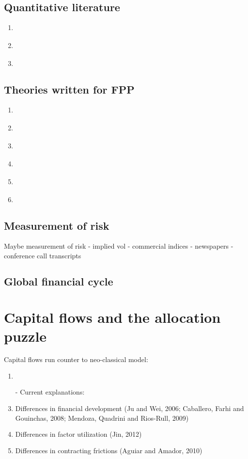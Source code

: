 \documentclass{ar-1col}
\begin{document}
\subsection{Quantitative literature}
\begin{enumerate}
\item \citet{ColacitoCroce2011}
\item \citet{GourioSiemerVerdelhan2013}
\item \citet{ColacitoCroceHoHoward2018}
\end{enumerate}
\subsection{Theories written for FPP}
\begin{enumerate}
    \item \citet{Heyerdahl-Larsen2011}
    \item \citet{Stathopoulos2017}
    \item \citet{Verdelhan2010}
    \item \citet{Backusetal2001}
    \item \citet{BansalShaliastovich2010}
    \item \citet{GabaixMaggiori2015}
\end{enumerate}

\subsection{Measurement of risk}
Maybe measurement of risk - implied vol - commercial indices -
newspapers - conference call transcripts

\subsection{Global financial cycle}

\section{Capital flows and the allocation puzzle}
Capital flows run counter to neo-classical model:
\begin{enumerate}
\item \citet{GourinchasJeanne2013}
\item[-] Current explanations:
\item Differences in financial development (Ju and Wei, 2006;
  Caballero, Farhi and Gouinchas, 2008; Mendoza, Quadrini and
  Rios-Rull, 2009)
\item Differences in factor utilization (Jin, 2012)
\item Differences in contracting frictions (Aguiar and Amador, 2010)
\end{enumerate}
\end{document}
